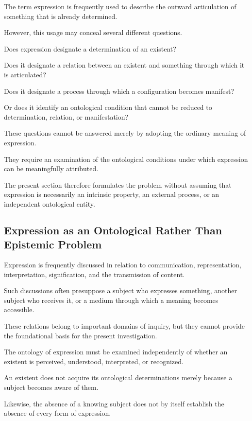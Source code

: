 The term expression is frequently used to describe
the outward articulation of something that
is already determined.

However, this usage may conceal several different
questions.

Does expression designate a determination
of an existent?

Does it designate a relation between an existent
and something through which it is articulated?

Does it designate a process through which
a configuration becomes manifest?

Or does it identify an ontological condition
that cannot be reduced to determination,
relation, or manifestation?

These questions cannot be answered merely
by adopting the ordinary meaning of expression.

They require an examination of the ontological
conditions under which expression can be
meaningfully attributed.

The present section therefore formulates
the problem without assuming that expression
is necessarily an intrinsic property,
an external process, or an independent
ontological entity.

\subsection{Expression as an Ontological Rather Than Epistemic Problem}

Expression is frequently discussed in relation
to communication, representation, interpretation,
signification, and the transmission of content.

Such discussions often presuppose a subject
who expresses something, another subject
who receives it, or a medium through which
a meaning becomes accessible.

These relations belong to important domains
of inquiry, but they cannot provide the
foundational basis for the present investigation.

The ontology of expression must be examined
independently of whether an existent is
perceived, understood, interpreted, or recognized.

An existent does not acquire its ontological
determinations merely because a subject
becomes aware of them.

Likewise, the absence of a knowing subject
does not by itself establish the absence
of every form of expression.

